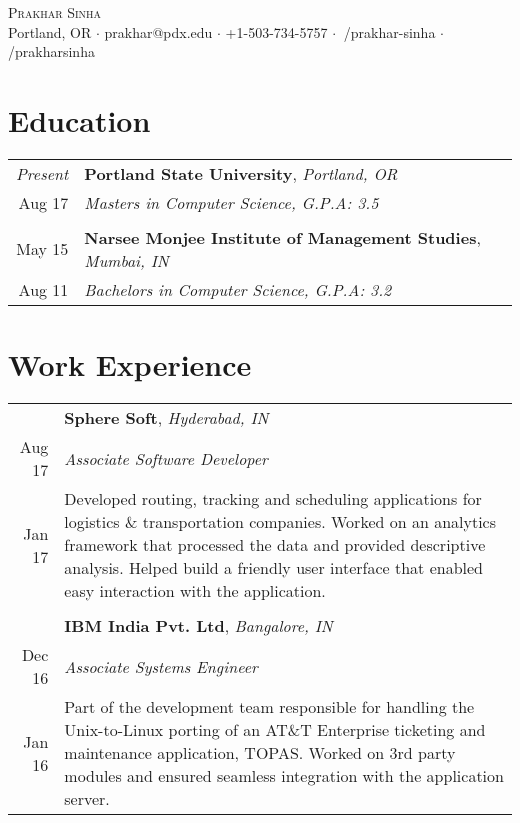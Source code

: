 \documentclass[a4paper,10pt]{article}
\begin{document}
\pagestyle{empty} %


\begin{center}
	{\Huge \scshape {Prakhar Sinha}}\\
	Portland, OR $\cdot$ prakhar@pdx.edu $\cdot$ +1-503-734-5757 $\cdot$ \faLinkedinSquare $\:$/prakhar-sinha  $\cdot$ \faGithubSquare $\:$/prakharsinha\\
\end{center}
 
\section{Education}
\begin{tabular}{r|p{15cm}}
 \emph{Present} & \textbf{Portland State University}, \emph{Portland, OR} \\ 
 Aug \textquotesingle{}17 & \emph{Masters in Computer Science, \textit{G.P.A: 3.5}}\\\multicolumn{2}{c}{} \\
 May \textquotesingle{}15 & \textbf{Narsee Monjee Institute of Management Studies}, \emph{Mumbai, IN} \\
 Aug \textquotesingle{}11 & \emph{Bachelors in Computer Science, \textit{G.P.A: 3.2}}\\%
\end{tabular}

\section{Work Experience}
\begin{tabular}{r|p{15cm}}
 & \textbf{Sphere Soft}, \sl{Hyderabad, IN} \\ 
 {Aug \textquotesingle{}17} & \emph{Associate Software Developer}\\
 {Jan \textquotesingle{}17} & \footnotesize{Developed routing, tracking and scheduling applications for logistics \& transportation companies. Worked on an analytics framework that processed the data and provided descriptive analysis. Helped build a friendly user interface that enabled easy interaction with the application.}\\\multicolumn{2}{c}{} \\
 
 & \textbf{IBM India Pvt. Ltd}, \sl{Bangalore, IN} \\
 {Dec \textquotesingle{}16} & \emph{Associate Systems Engineer}\\
 {Jan \textquotesingle{}16} & \footnotesize{Part of the development team responsible for handling the Unix-to-Linux porting of an AT\&T Enterprise ticketing and maintenance application, TOPAS. Worked on 3rd party modules and ensured seamless integration with the application server.}\\%
\end{tabular}
\end{document}
